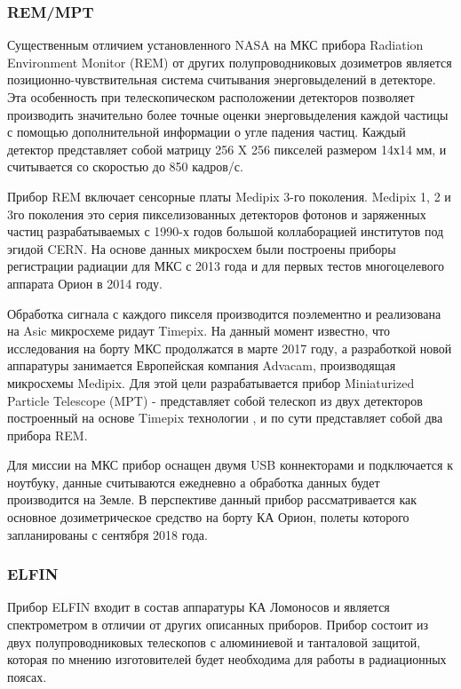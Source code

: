 \subsubsection{REM/MPT}

Существенным отличием установленного NASA на МКС прибора Radiation Environment Monitor (REM) от других полупроводниковых дозиметров  является позиционно-чувствительная система считывания энерговыделений в детекторе. Эта особенность при телескопическом расположении детекторов позволяет производить значительно более точные оценки энерговыделения каждой частицы с помощью дополнительной информации о угле падения частиц. Каждый детектор представляет собой матрицу 256 X 256 пикселей размером 14х14 мм, и считывается со скоростью до 850 кадров/с.

Прибор REM включает сенсорные платы Medipix 3-го поколения. Medipix 1, 2 и 3го поколения это серия пикселизованных детекторов фотонов и заряженных частиц разрабатываемых с 1990-х годов большой коллаборацией институтов под эгидой CERN. На основе данных микросхем были построены приборы регистрации радиации для МКС с 2013 года и для первых тестов многоцелевого аппарата Орион в 2014 году.

Обработка сигнала с каждого пикселя производится поэлементно и реализована на Asic микросхеме ридаут Timepix. На данный момент известно, что исследования на борту МКС продолжатся в марте 2017 году, а разработкой новой аппаратуры занимается Европейская компания Advacam, производящая микросхемы Medipix. Для этой цели разрабатывается прибор Miniaturized Particle Telescope (MPT)\cite{Fry2016} - представляет собой телескоп из двух детекторов построенный на основе Timepix технологии \cite{Kroupa2015}, и по сути представляет собой два прибора REM. 

Для миссии на МКС прибор оснащен двумя USB коннекторами и подключается к ноутбуку, данные считываются ежедневно а обработка данных будет производится на Земле. В перспективе данный прибор рассматривается как основное дозиметрическое средство на борту КА Орион, полеты которого запланированы с сентября 2018 года.


\subsubsection{ELFIN}
Прибор ELFIN входит в состав аппаратуры КА Ломоносов и является спектрометром в отличии от других описанных приборов. Прибор состоит из двух полупроводниковых телескопов с алюминиевой и танталовой защитой, которая по мнению изготовителей будет необходима для работы в радиационных поясах.\cite{VassilisAngelopoulos}

